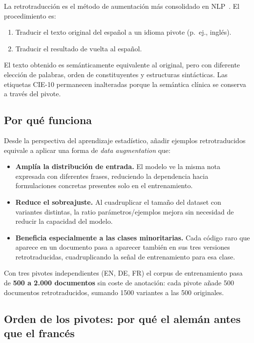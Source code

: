 La retrotraducción es el método de aumentación más consolidado en NLP~\cite{sennrich2016improving}. El procedimiento es:

\begin{enumerate}
  \item Traducir el texto original del español a un idioma pivote (p.~ej., inglés).
  \item Traducir el resultado de vuelta al español.
\end{enumerate}

El texto obtenido es semánticamente equivalente al original, pero con diferente elección de palabras, orden de constituyentes y estructuras sintácticas. Las etiquetas CIE-10 permanecen inalteradas porque la semántica clínica se conserva a través del pivote.

\subsection{Por qué funciona}

Desde la perspectiva del aprendizaje estadístico, añadir ejemplos retrotraducidos equivale a aplicar una forma de \emph{data augmentation} que:

\begin{itemize}
  \item \textbf{Amplía la distribución de entrada.} El modelo ve la misma nota expresada con diferentes frases, reduciendo la dependencia hacia formulaciones concretas presentes solo en el entrenamiento.
  \item \textbf{Reduce el sobreajuste.} Al cuadruplicar el tamaño del dataset con variantes distintas, la ratio parámetros/ejemplos mejora sin necesidad de reducir la capacidad del modelo.
  \item \textbf{Beneficia especialmente a las clases minoritarias.} Cada código raro que aparece en un documento pasa a aparecer también en sus tres versiones retrotraducidas, cuadruplicando la señal de entrenamiento para esa clase.
\end{itemize}

Con tres pivotes independientes (EN, DE, FR) el corpus de entrenamiento pasa de \textbf{500 a 2.000 documentos} sin coste de anotación: cada pivote añade 500 documentos retrotraducidos, sumando 1500 variantes a las 500 originales.

\subsection{Orden de los pivotes: por qué el alemán antes que el francés}

